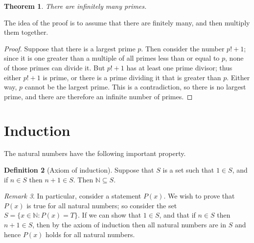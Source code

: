 \documentclass[a4paper, 10pt]{amsart}
\newtheorem{thm}{Theorem}[section]
\theoremstyle{definition}
\newtheorem{defn}[thm]{Definition}
\theoremstyle{remark}
\newtheorem{rem}[thm]{Remark}
\begin{document}
\begin{thm}
  There are infinitely many primes.
\end{thm}
The idea of the proof is to assume that there are finitely many, and then multiply them together.
\begin{proof}
  Suppose that there is a largest prime $ p $. Then consider the number $ p! + 1 $; since it is one
  greater than a multiple of all primes less than or equal to $ p $, none of those primes can divide it.
  But $ p! + 1 $ has at least one prime divisor; thus either $ p! + 1 $ is prime, or there is a prime
  dividing it that is greater than $ p $. Either way, $ p $ cannot be the largest prime. This is a contradiction,
  so there is no largest prime, and there are therefore an infinite number of primes.
\end{proof}

\section{Induction}
The natural numbers have the following important property.
\begin{defn}[Axiom of induction]
  Suppose that $ S $ is a set such that $ 1 \in S $, and if $ n \in S $ then $ n + 1 \in S $.
  Then $ \mathbb{N} \subseteq S $.
\end{defn}
\begin{rem}
  In particular, consider a statement $ P(x) $. We wish to prove that $ P(x) $ is true
  for all natural numbers; so consider the set $ S = \{ x \in \mathbb{N} : P(x) = T \} $. If
  we can show that $ 1 \in S $, and that if $ n \in S $ then $ n + 1 \in S $, then by the axiom
  of induction then all natural numbers are in $ S $ and hence $ P(x) $ holds for all natural numbers.
\end{rem}
\end{document}
